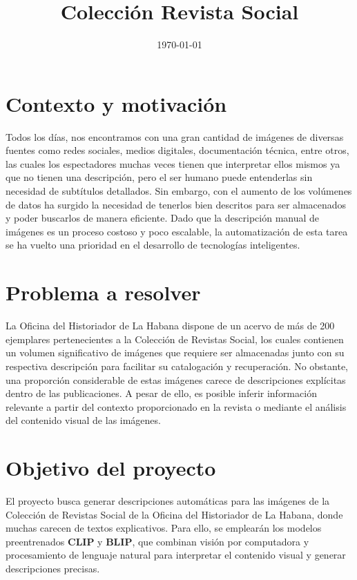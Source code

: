 \documentclass[14pt]{extarticle}
\title{Colección Revista Social}
\date{\today}
\begin{document}
\maketitle

\section{Contexto y motivación}

Todos los días, nos encontramos con una gran cantidad de imágenes de diversas fuentes como redes sociales, medios digitales, documentación técnica, entre otros, las cuales los espectadores muchas veces tienen que interpretar ellos mismos ya que no tienen una descripción, pero el ser humano puede entenderlas sin necesidad de subtítulos detallados. Sin embargo, con el aumento de los volúmenes de datos ha surgido la necesidad de tenerlos bien descritos para ser almacenados y poder buscarlos de manera eficiente. Dado que la descripción manual de imágenes es un proceso costoso y poco escalable, la automatización de esta tarea se ha vuelto una prioridad en el desarrollo de tecnologías inteligentes.

\section{Problema a resolver}

La Oficina del Historiador de La Habana dispone de un acervo de más de 200 ejemplares pertenecientes a la Colección de Revistas Social, los cuales contienen un volumen significativo de imágenes que requiere ser almacenadas junto con su respectiva descripción para facilitar su catalogación y recuperación. No obstante, una proporción considerable de estas imágenes carece de descripciones explícitas dentro de las publicaciones. A pesar de ello, es posible inferir información relevante a partir del contexto proporcionado en la revista o mediante el análisis del contenido visual de las imágenes.

\section{Objetivo del proyecto}

El proyecto busca generar descripciones automáticas para las imágenes de la Colección de Revistas Social de la Oficina del Historiador de La Habana, donde muchas carecen de textos explicativos. Para ello, se emplearán los modelos preentrenados \textbf{CLIP} y \textbf{BLIP}, que combinan visión por computadora y procesamiento de lenguaje natural para interpretar el contenido visual y generar descripciones precisas.
\end{document}
